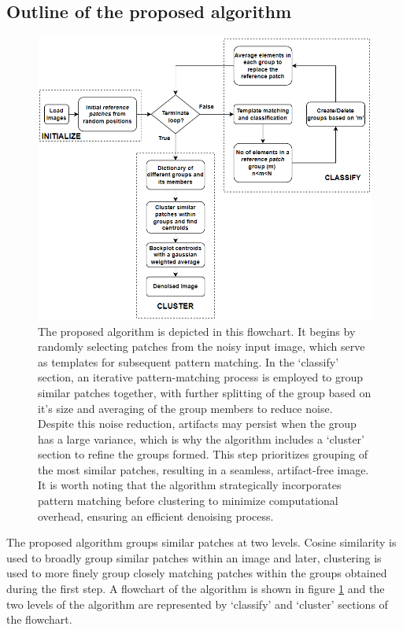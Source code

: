 \documentclass[fleqn,10pt]{wlscirep}
\begin{document}
	\subsection*{Outline of the proposed algorithm}
	
	\begin{figure}[H]
		\centering
		\includegraphics[scale=0.7]{./imgs/flowchart.png}
		\caption{ The proposed algorithm is depicted in this flowchart. It begins by randomly selecting patches from the noisy input image, which serve as templates for subsequent pattern matching. In the `classify' section, an iterative pattern-matching process is employed to group similar patches together, with further splitting of the group based on it's size and averaging of the group members to reduce noise. Despite this noise reduction, artifacts may persist when the group has a large variance, which is why the algorithm includes a `cluster' section to refine the groups formed. This step prioritizes grouping of the most similar patches, resulting in a seamless, artifact-free image. It is worth noting that the algorithm strategically incorporates pattern matching before clustering to minimize computational overhead, ensuring an efficient denoising process.}
		\label{fig:flowchart}
	\end{figure} 
	
	The proposed algorithm groups similar patches at two levels. Cosine similarity is used to broadly group similar patches within an image and later, clustering is used to more finely group closely matching patches within the groups obtained during the first step. A flowchart of the algorithm is shown in figure \ref{fig:flowchart} and the two levels of the algorithm are represented by `classify' and `cluster' sections of the flowchart.
	
\end{document}
